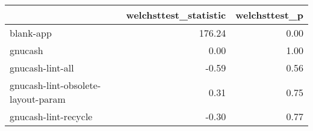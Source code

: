 \begin{tabular}{lrr}
\toprule
{} &  welchsttest\_statistic &  welchsttest\_p \\
\midrule
blank-app                          &                 176.24 &           0.00 \\
gnucash                            &                   0.00 &           1.00 \\
gnucash-lint-all                   &                  -0.59 &           0.56 \\
gnucash-lint-obsolete-layout-param &                   0.31 &           0.75 \\
gnucash-lint-recycle               &                  -0.30 &           0.77 \\
\bottomrule
\end{tabular}
